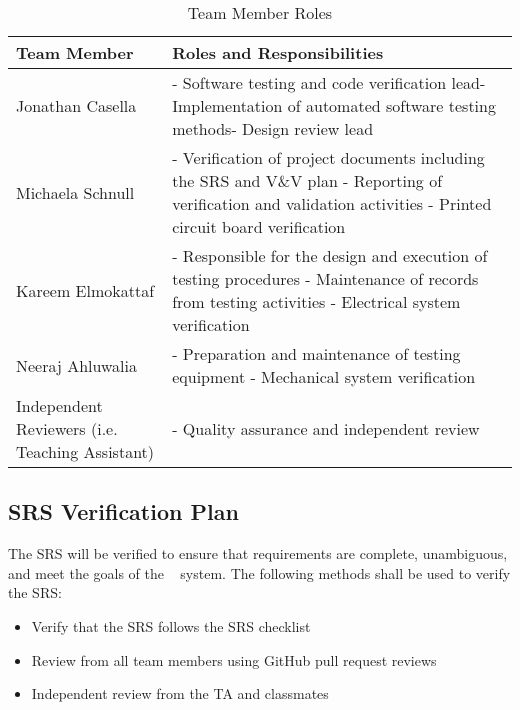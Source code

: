 \documentclass[12pt, titlepage]{article}
\begin{document}
\begin{table}[H]
\caption{Team Member Roles}
\label{Table:Roles}
\begin{tabularx}{\textwidth}{|p{5cm}|X|}
\hline{\bf Team Member} & {\bf Roles and Responsibilities} \\
\hline
Jonathan Casella & - Software testing and code verification lead\newline - Implementation of automated software testing methods\newline - Design review lead\\
\hline
Michaela Schnull &  - Verification of project documents including the SRS and V\&V plan \newline - Reporting of verification and validation activities \newline - Printed circuit board verification\\
\hline
Kareem Elmokattaf &  - Responsible for the design and execution of testing procedures \newline - Maintenance of records from testing activities \newline - Electrical system verification\\
\hline
Neeraj Ahluwalia &  - Preparation and maintenance of testing equipment \newline - Mechanical system verification\\
\hline
Independent Reviewers (i.e. Teaching Assistant) &  - Quality assurance and independent review\\
\hline
\end{tabularx}
\label{Table:Roles}
\end{table}

\subsection{SRS Verification Plan}



The SRS will be verified to ensure that requirements are complete, unambiguous, and meet the goals of the \progname~ system. The following methods shall be used to verify the SRS: 

\begin{itemize}
  \item Verify that the SRS follows the SRS checklist \cite{Checklist-SRS}
  \item Review from all team members using GitHub pull request reviews
  \item Independent review from the TA and classmates
\end{itemize}
\end{document}
